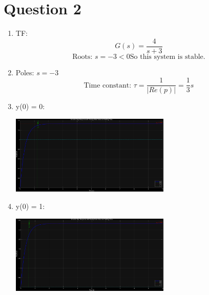 \documentclass[12pt]{article}
\begin{document}
\section*{Question 2}
    \begin{enumerate}[label=\alph*]
        \item TF:
        \[G(s) = \frac{4}{s+3}\]
        \[\text{Roots: } s = -3 < 0 \text{So this system is stable.}\]
        
        \item Poles: $s = -3$
        \[\text{Time constant: } \tau = \frac{1}{|Re(p)|} = \frac{1}{3}s\]

        \item y(0) = 0:
        \begin{center}
            \includegraphics[width=0.6\textwidth]{Q2c.png}
        \end{center}

        \item y(0) = 1:
        \begin{center}
            \includegraphics[width=0.6\textwidth]{Q2d.png}
        \end{center}

    \end{enumerate}
\end{document}
